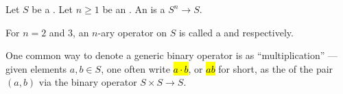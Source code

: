 \begin{definition} \label{definition:n_ary_operation_binary_operation_ternary_operation_on_a_set}
    Let $S$ be a . Let $n \geq 1$ be an .
    An  is a  $S^n \to S$. 
    
    For $n=2$ and $3$, an $n$-ary operator on $S$ is called a  and  respectively.

    One common way to denote a generic binary operator is as ``multiplication'' --- given elements $a,b \in S$, one often write \hl{$a \cdot b$}, or \hl{$ab$} for short, as the  of the pair $(a,b)$ via the binary operator $S \times S \to S$.
\end{definition}